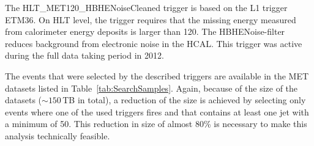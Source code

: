 %
\renewcommand{\arraystretch}{1.5}
\begin{table}[!t]
\centering
\caption{\met and \met+ jet triggers used in this analysis together with the corresponding recorded integrated luminosity during the time when they were in place.}
\label{tab:triggers}
\end{table}  

The HLT\_MET120\_HBHENoiseCleaned trigger is based on the L1 trigger ETM36. %
On HLT level, the trigger requires that the missing energy measured from calorimeter energy deposits is larger than 120\gev.
The HBHENoise-filter reduces background from electronic noise in the HCAL.
This trigger was active during the full data taking period in 2012.

\renewcommand{\arraystretch}{1.5}
\begin{table}[!b]
\centering
\caption{MET data samples used in the search with the contained integrated \mbox{luminosity}.}
\label{tab:SearchSamples}
\end{table} 
The events that were selected by the described triggers are available in the MET datasets listed in Table~\ref{tab:SearchSamples}. 
Again, because of the size of the datasets ($\sim150\,$TB in total), a reduction of the size is achieved by selecting only events where one of the used triggers fires and that contains at least one jet with a minimum \pt of 50\gev.
This reduction in size of almost 80\% is necessary to make this analysis technically feasible.


